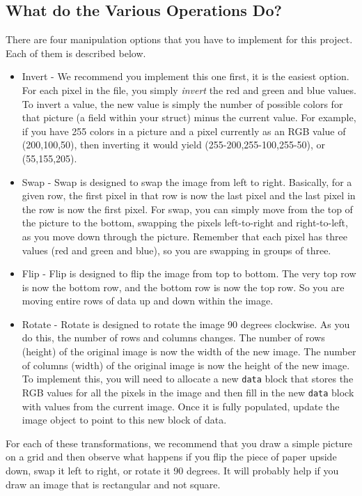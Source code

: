 \documentclass[12pt]{article}
\begin{document}
\subsection*{What do the Various Operations Do?}

There are four manipulation options that you have to implement for this project.  Each
of them is described below.

\begin{itemize}
\item Invert - We recommend you implement this one first, it is the easiest
option.  For each pixel in the file, you simply {\it invert} the red and green
and blue values.  To invert a value, the new value is simply the number of
possible colors for that picture (a field within your struct) minus the current
value.  For example, if you have 255 colors in a picture and a pixel currently
as an RGB value of (200,100,50), then inverting it would yield
(255-200,255-100,255-50), or (55,155,205).
\item Swap - Swap is designed to swap the image from left to right.  Basically,
for a given row, the first pixel in that row is now the last pixel and the last
pixel in the row is now the first pixel.  For swap, you can simply move
from the top of the picture to the bottom, swapping the pixels left-to-right
and right-to-left, as you move down through the picture.  Remember that each
pixel has three values (red and green and blue), so you are swapping in
groups of three.
\item Flip - Flip is designed to flip the image from top to bottom.  The very
top row is now the bottom row, and the bottom row is now the top row.  So you
are moving entire rows of data up and down within the image.
\item Rotate - Rotate is designed to rotate the image 90 degrees clockwise.
As you do this, the number of rows and columns changes.  The number of rows
(height) of the original image is now the width of the new image.  The
number of columns (width) of the original image is now the height of the 
new image.  To implement this, you will need to allocate a new {\tt data}
block that stores the RGB values for all the pixels in the image and then
fill in the new {\tt data} block with values from the current image.  Once it is
fully populated, update the image object to point to this new block of data.
\end{itemize}

For each of these transformations, we recommend that you draw a simple picture
on a grid and then observe what happens if you flip the piece of paper upside
down, swap it left to right, or rotate it 90 degrees.  It will probably
help if you draw an image that is rectangular and not square.
\end{document}

